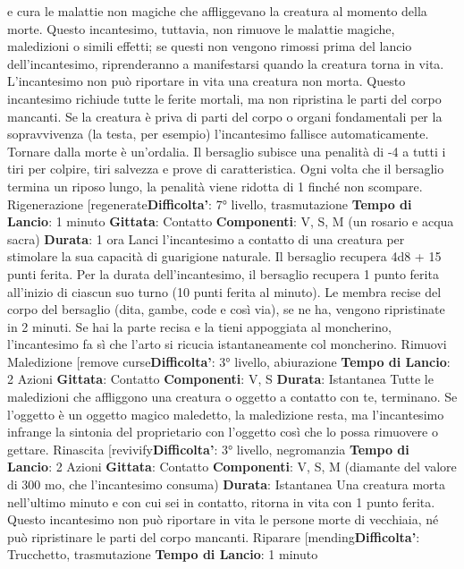 \begin{multicols}{2}
e cura le malattie non magiche che affliggevano la
creatura al momento della morte. Questo incantesimo,
tuttavia, non rimuove le malattie magiche, maledizioni o
simili effetti; se questi non vengono rimossi prima del
lancio dell’incantesimo, riprenderanno a manifestarsi
quando la creatura torna in vita. L’incantesimo non può
riportare in vita una creatura non morta.
Questo incantesimo richiude tutte le ferite mortali, ma
non ripristina le parti del corpo mancanti. Se la creatura
è priva di parti del corpo o organi fondamentali per la
sopravvivenza (la testa, per esempio) l’incantesimo
fallisce automaticamente.
Tornare dalla morte è un’ordalia. Il bersaglio subisce
una penalità di -4 a tutti i tiri per colpire, tiri salvezza e
prove di caratteristica. Ogni volta che il bersaglio
termina un riposo lungo, la penalità viene ridotta di 1
finché non scompare.
Rigenerazione
[regenerate\textbf{Difficolta'}:
7° livello, trasmutazione
\textbf{Tempo di Lancio}: 1 minuto
\textbf{Gittata}: Contatto
\textbf{Componenti}: V, S, M (un rosario e acqua sacra)
\textbf{Durata}: 1 ora
Lanci l’incantesimo a contatto di una creatura per
stimolare la sua capacità di guarigione naturale. Il
bersaglio recupera 4d8 + 15 punti ferita. Per la durata
dell’incantesimo, il bersaglio recupera 1 punto ferita
all’inizio di ciascun suo turno (10 punti ferita al minuto).
Le membra recise del corpo del bersaglio (dita, gambe,
code e così via), se ne ha, vengono ripristinate in 2
minuti. Se hai la parte recisa e la tieni appoggiata al
moncherino, l’incantesimo fa sì che l’arto si ricucia
istantaneamente col moncherino.
Rimuovi Maledizione
[remove curse\textbf{Difficolta'}:
3° livello, abiurazione
\textbf{Tempo di Lancio}: 2 Azioni
\textbf{Gittata}: Contatto
\textbf{Componenti}: V, S
\textbf{Durata}: Istantanea
Tutte le maledizioni che affliggono una creatura o
oggetto a contatto con te, terminano. Se l’oggetto è un
oggetto magico maledetto, la maledizione resta, ma
l’incantesimo infrange la sintonia del proprietario con
l’oggetto così che lo possa rimuovere o gettare.
Rinascita
[revivify\textbf{Difficolta'}:
3° livello, negromanzia
\textbf{Tempo di Lancio}: 2 Azioni
\textbf{Gittata}: Contatto
\textbf{Componenti}: V, S, M (diamante del valore di 300 mo,
che l’incantesimo consuma)
\textbf{Durata}: Istantanea
Una creatura morta nell’ultimo minuto e con cui sei in
contatto, ritorna in vita con 1 punto ferita. Questo
incantesimo non può riportare in vita le persone morte
di vecchiaia, né può ripristinare le parti del corpo
mancanti.
Riparare
[mending\textbf{Difficolta'}:
Trucchetto, trasmutazione
\textbf{Tempo di Lancio}: 1 minuto

\end{multicols}
